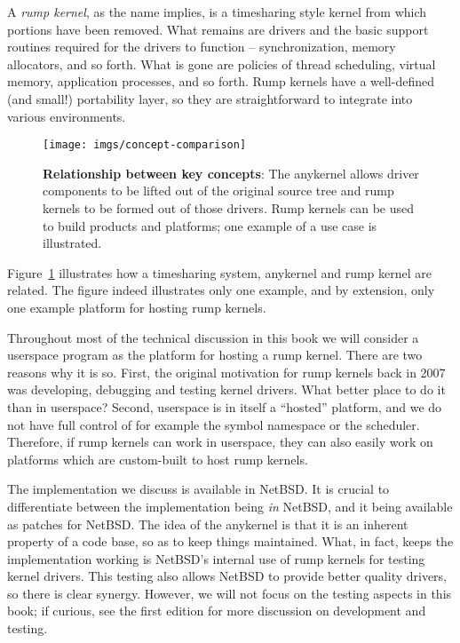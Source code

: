 A \textit{rump kernel}, as the name implies, is a timesharing style
kernel from which portions have been removed.  What remains are drivers
and the basic support routines required for the drivers to function --
synchronization, memory allocators, and so forth.  What is gone are
policies of thread scheduling, virtual memory, application processes,
and so forth.  Rump kernels have a well-defined (and small!) portability
layer, so they are straightforward to integrate into various environments.

\begin{figure}[t]
\texttt{[image: imgs/concept-comparison]}
\caption[Relationship between key concepts]
{\textbf{Relationship between key concepts}:
The anykernel allows driver components to be lifted out of the original
source tree and rump kernels to be formed out of those drivers.
Rump kernels can be used to build products and platforms; one example
of a use case is illustrated.
}
\label{fig:concept-comparison}
\end{figure}

Figure~\ref{fig:concept-comparison} illustrates how a timesharing system,
anykernel and rump kernel are related.  The figure indeed illustrates
only one example, and by extension, only one example platform for hosting
rump kernels.

Throughout most of the technical discussion in this book we will
consider a userspace program as the platform for hosting a rump kernel.
There are two reasons why it is so.  First, the original motivation for
rump kernels back in 2007 was developing, debugging and testing kernel
drivers.  What better place to do it than in userspace?  Second, userspace
is in itself a ``hosted'' platform, and we do not have full control of
for example the symbol namespace or the scheduler.  Therefore, if rump
kernels can work in userspace, they can also easily work on platforms
which are custom-built to host rump kernels.

The implementation we discuss is available in NetBSD.  It is crucial
to differentiate between the implementation being \textit{in} NetBSD,
and it being available as patches for NetBSD.  The idea of the anykernel
is that it is an inherent property of a code base, so as to keep things
maintained.  What, in fact, keeps the implementation working is NetBSD's
internal use of rump kernels for testing kernel drivers.  This testing
also allows NetBSD to provide better quality drivers, so there is clear
synergy.  However, we will not focus on the testing aspects in this book;
if curious, see the first edition for more discussion on development
and testing.


